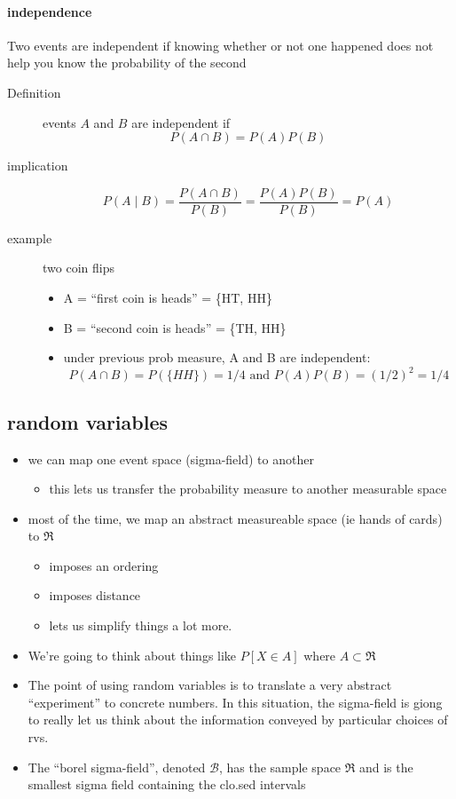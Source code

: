 \paragraph{independence}

      Two events are independent if knowing whether or not one
      happened does not help you know the probability of the second
\begin{description}
\item[Definition] events $A$ and $B$ are independent if \[P(A \cap
                      B) = P(A) P(B)\]
\item[implication] \[P(A \mid B) = \frac{P(A \cap B)}{P(B)} =
                       \frac{P(A) P(B)}{P(B)} = P(A)\]
\item[example] two coin flips
\begin{itemize}
\item A = ``first coin is heads'' = \{HT, HH\}
\item B = ``second coin is heads'' = \{TH, HH\}
\item under previous prob measure, A and B are independent: \[P(A
          \cap B) = P(\{HH\}) = 1/4 \text{ and } P(A)P(B) = (1/2)^2 = 1/4\]
\end{itemize}
\end{description}

\subsection{random variables}

\begin{itemize}
\item we can map one event space (sigma-field) to another
\begin{itemize}
\item this lets us transfer the probability measure to another
        measurable space
\end{itemize}
\item most of the time, we map an abstract measureable space (ie hands
      of cards) to $\Re$
\begin{itemize}
\item imposes an ordering
\item imposes distance
\item lets us simplify things a lot more.
\end{itemize}
\item We're going to think about things like $P[X \in A]$ where $A
      \subset \Re$
\item The point of using random variables is to translate a very
      abstract ``experiment'' to concrete numbers.  In this situation,
      the sigma-field is giong to really let us think about the
      information conveyed by particular choices of rvs.
\item The ``borel sigma-field'', denoted $\mathcal B$, has the sample
      space $\Re$ and is the smallest sigma field containing the
      clo.sed intervals
\end{itemize}


